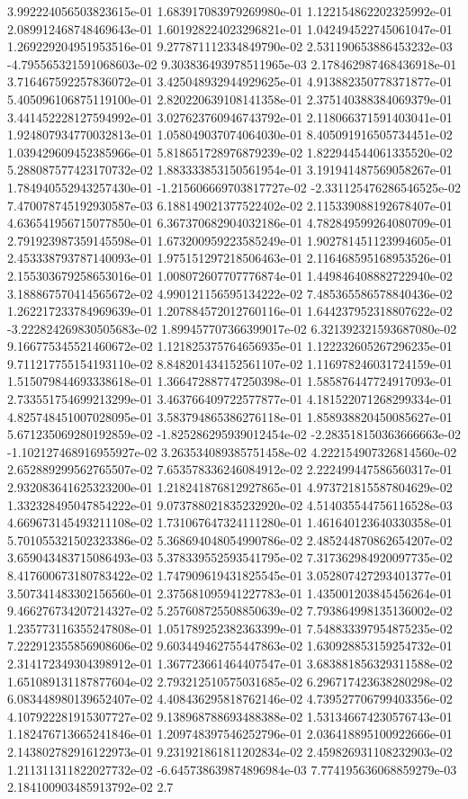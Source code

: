 3.992224056503823615e-01	1.683917083979269980e-01	1.122154862202325992e-01	2.089912468748469643e-01	1.601928224023296821e-01	1.042494522745061047e-01	1.269229204951953516e-01	9.277871112334849790e-02	2.531190653886453232e-03	-4.795565321591068603e-02	9.303836493978511965e-03	2.178462987468436918e-01	3.716467592257836072e-01	3.425048932944929625e-01	4.913882350778371877e-01	5.405096106875119100e-01	2.820220639108141358e-01	2.375140388384069379e-01	3.441452228127594992e-01	3.027623760946743792e-01	2.118066371591403041e-01	1.924807934770032813e-01	1.058049037074064030e-01	8.405091916505734451e-02	1.039429609452385966e-01	5.818651728976879239e-02	1.822944544061335520e-02	5.288087577423170732e-02	1.883333853150561954e-01	3.191941487569058267e-01	1.784940552943257430e-01	-1.215606669703817727e-02	-2.331125476286546525e-02	7.470078745192930587e-03	6.188149021377522402e-02	2.115339088192678407e-01	4.636541956715077850e-01	6.367370682904032186e-01	4.782849599264080709e-01	2.791923987359145598e-01	1.673200959223585249e-01	1.902781451123994605e-01	2.453338793787140093e-01	1.975151297218506463e-01	2.116468595168953526e-01	2.155303679258653016e-01	1.008072607707776874e-01	1.449846408882722940e-02	3.188867570414565672e-02	4.990121156595134222e-02	7.485365586578840436e-02	1.262217233784969639e-01	1.207884572012760116e-01	1.644237952318807622e-02	-3.222824269830505683e-02	1.899457707366399017e-02	6.321392321593687080e-02	9.166775345521460672e-02	1.121825375764656935e-01	1.122232605267296235e-01	9.711217755154193110e-02	8.848201434152561107e-02	1.116978246031724159e-01	1.515079844693338618e-01	1.366472887747250398e-01	1.585876447724917093e-01	2.733551754699213299e-01	3.463766409722577877e-01	4.181522071268299334e-01	4.825748451007028095e-01	3.583794865386276118e-01	1.858938820450085627e-01	5.671235069280192859e-02	-1.825286295939012454e-02	-2.283518150363666663e-02	-1.102127468916955927e-02	3.263534089385751458e-02	4.222154907326814560e-02	2.652889299562765507e-02	7.653578336246084912e-02	2.222499447586560317e-01	2.932083641625323200e-01	1.218241876812927865e-01	4.973721815587804629e-02	1.332328495047854222e-01	9.073788021835232920e-02	4.514035544756116528e-03	4.669673145493211108e-02	1.731067647324111280e-01	1.461640123640330358e-01	5.701055321502323386e-02	5.368694048054990786e-02	2.485244870862654207e-02	3.659043483715086493e-03	5.378339552593541795e-02	7.317362984920097735e-02	8.417600673180783422e-02	1.747909619431825545e-01	3.052807427293401377e-01	3.507341483302156560e-01	2.375681095941227783e-01	1.435001203845456264e-01	9.466276734207214327e-02	5.257608725508850639e-02	7.793864998135136002e-02	1.235773116355247808e-01	1.051789252382363399e-01	7.548833397954875235e-02	7.222912355856908606e-02	9.603449462755447863e-02	1.630928853159254732e-01	2.314172349304398912e-01	1.367723661464407547e-01	3.683881856329311588e-02	1.651089131187877604e-02	2.793212510575031685e-02	6.296717423638280298e-02	6.083448980139652407e-02	4.408436295818762146e-02	4.739527706799403356e-02	4.107922281915307727e-02	9.138968788693488388e-02	1.531346674230576743e-01	1.182476713665241846e-01	1.209748397546252796e-01	2.036418895100922666e-01	2.143802782916122973e-01	9.231921861811202834e-02	2.459826931108232903e-02	1.211311311822027732e-02	-6.645738639874896984e-03	7.774195636068859279e-03	2.184100903485913792e-02	2.7